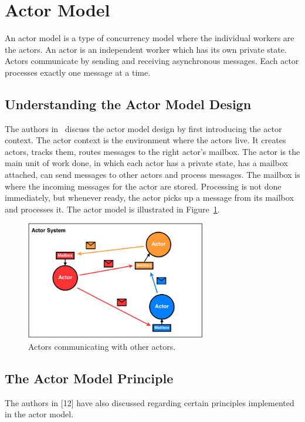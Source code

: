 \section{Actor Model\label{sec:actor}}
An actor model is a type of concurrency model where the individual workers are the actors. An actor is an independent worker which has its own private state. Actors communicate by sending and receiving asynchronous messages. Each actor processes exactly one message at a time.

\subsection{Understanding the Actor Model Design}
The authors in~\cite{8316391} discuss the actor model design by first introducing the actor context. The actor context is the environment where the actors live. It creates actors, tracks them, routes messages to the right actor's mailbox.  The actor is the main unit of work done, in which each actor has a private state, has a mailbox attached, can send messages to other actors and process messages. The mailbox is where the incoming messages for the actor are stored. Processing is not done immediately, but whenever ready, the actor picks up a message from its mailbox and processes it. 
The actor model is illustrated in Figure~\ref{fig:actor}. 
\begin{figure}[h]
    \centering
    \includegraphics[width=0.7\textwidth]{actor.png}
    \caption{Actors communicating with other actors.}
    \label{fig:actor}
\end{figure}
\subsection{The Actor Model Principle}
The authors in [12] have also discussed regarding certain principles implemented in the actor model.

